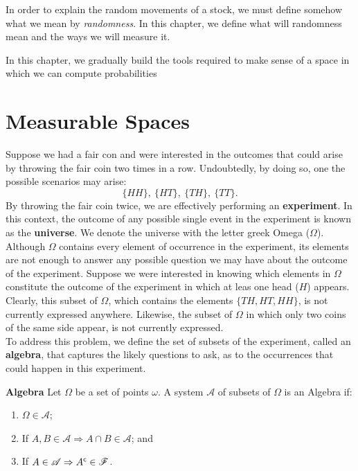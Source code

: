 \documentclass[../TGMAFFIRO.tex]{subfiles}
\begin{document}
In order to explain the random movements of a stock, we must define somehow what we mean by \textit{randomness}. In this chapter, we define what will randomness mean and the ways we will measure it.

In this chapter, we gradually build the tools required to make sense of a space in which we can compute probabilities 

\section{Measurable Spaces}
Suppose we had a fair con and were interested in the outcomes that could arise by throwing the fair coin two times in a row. Undoubtedly, by doing so, one the possible scenarios may arise:
\[
	\{HH\}, \ \{HT\}, \ \{TH\}, \ \{TT\}.
\]
By throwing the fair coin twice, we are effectively performing an \textbf{experiment}. In this context, the outcome of any possible single event in the experiment is known as the \textbf{universe}. We denote the universe with the letter greek Omega ($\Omega$).\\

Although $\Omega$ contains every element of occurrence in the experiment, its elements are not enough to answer any possible question we may have about the outcome of the experiment. Suppose we were interested in knowing which elements in $\Omega$ constitute the outcome of the experiment in which at leas one head ($H$) appears.  Clearly, this subset of $\Omega$, which contains the elements $\{TH, HT, HH\}$, is not currently expressed anywhere. Likewise, the subset of $\Omega$ in which only two coins of the same side appear, is not currently expressed.\\

To address this problem, we define the set of subsets of the experiment, called an \textbf{algebra}, that captures the likely questions to ask, as to the occurrences that could happen in this experiment.

\begin{definition}{\textbf{Algebra}}\label{def:algebra}
	Let $\Omega$ be a set of points $\omega$. A system $\mathscr{A}$ of subsets of $\Omega$ is an Algebra if:
	\begin{enumerate}
		\item $\Omega \in \mathscr{A}$;
		\item If $A, B \in \mathscr{A} \Rightarrow A \cap B \in \mathscr{A}$; and
		\item If $A \in \mathscr{A} \Rightarrow A^\mathsf{c} \in \mathscr{F}$.
	\end{enumerate}
\end{definition}
\end{document}
